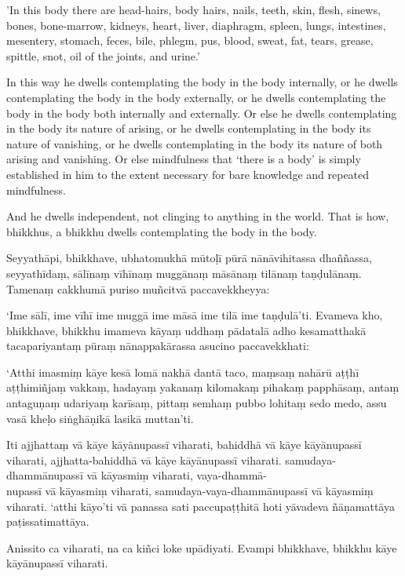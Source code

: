'In this body there are head-hairs, body hairs, nails, teeth, skin, flesh,
sinews, bones, bone-marrow, kidneys, heart, liver, diaphragm, spleen, lungs,
intestines, mesentery, stomach, feces, bile, phlegm, pus, blood, sweat, fat,
tears, grease, spittle, snot, oil of the joints, and urine.'

In this way he dwells contemplating the body in the body internally, or he
dwells contemplating the body in the body externally, or he dwells contemplating
the body in the body both internally and externally. Or else he dwells
contemplating in the body its nature of arising, or he dwells contemplating in
the body its nature of vanishing, or he dwells contemplating in the body its
nature of both arising and vanishing. Or else mindfulness that ‘there is a body’
is simply established in him to the extent necessary for bare knowledge and
repeated mindfulness.

And he dwells independent, not clinging to anything in the world. That is how,
bhikkhus, a bhikkhu dwells contemplating the body in the body.


\paliPage

Seyyathāpi, bhikkhave, ubhatomukhā mūtoḷī pūrā nānāvihitassa dhaññassa, seyyathīdaṃ,
sālīnaṃ vīhīnaṃ muggānaṃ māsānaṃ tilānaṃ taṇḍulānaṃ. Tamenaṃ cakkhumā puriso
muñcitvā paccavekkheyya:

‘Ime sālī, ime vīhī ime muggā ime māsā ime tilā ime taṇḍulā’ti. Evameva kho,
bhikkhave, bhikkhu imameva kāyaṃ uddhaṃ pādatalā adho kesamatthakā
tacapariyantaṃ pūraṃ nānappakārassa asucino paccavekkhati:

‘Atthi imasmiṃ kāye kesā lomā nakhā dantā taco, maṃsaṃ nahārū aṭṭhī aṭṭhimiñjaṃ
vakkaṃ, hadayaṃ yakanaṃ kilomakaṃ pihakaṃ papphāsaṃ, antaṃ antaguṇaṃ udariyaṃ
karīsaṃ, pittaṃ semhaṃ pubbo lohitaṃ sedo medo, assu vasā kheḷo siṅghāṇikā lasikā
muttan’ti.

Iti ajjhattaṃ vā kāye kāyānupassī viharati, bahiddhā vā kāye kāyānupassī
viharati, ajjhatta-bahiddhā vā kāye kāyānupassī viharati. samudaya-dhammānupassī
vā kāyasmiṃ viharati, vaya-dhammā-\\
nupassī vā kāyasmiṃ viharati, samudaya-vaya-dhammānupassī vā kāyasmiṃ viharati.
‘atthi kāyo’ti vā panassa sati paccupaṭṭhitā hoti yāvadeva ñāṇamattāya
paṭissatimattāya.

Anissito ca viharati, na ca kiñci loke upādiyati. Evampi bhikkhave, bhikkhu kāye
kāyānupassī viharati.

